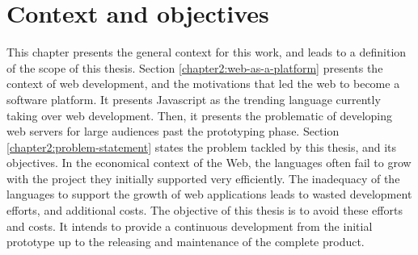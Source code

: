 \chapter{Context and objectives} \label{chapter2}
\minitoc
\eject

This chapter presents the general context for this work, and leads to a definition of the scope of this thesis.
Section \ref{chapter2:web-as-a-platform} presents the context of web development, and the motivations that led the web to become a software platform.
It presents Javascript as the trending language currently taking over web development.
Then, it presents the problematic of developing web servers for large audiences past the prototyping phase.
Section \ref{chapter2:problem-statement} states the problem tackled by this thesis, and its objectives.
In the economical context of the Web, the languages often fail to grow with the project they initially supported very efficiently.
The inadequacy of the languages to support the growth of web applications leads to wasted development efforts, and additional costs.
The objective of this thesis is to avoid these efforts and costs.
It intends to provide a continuous development from the initial prototype up to the releasing and maintenance of the complete product.


